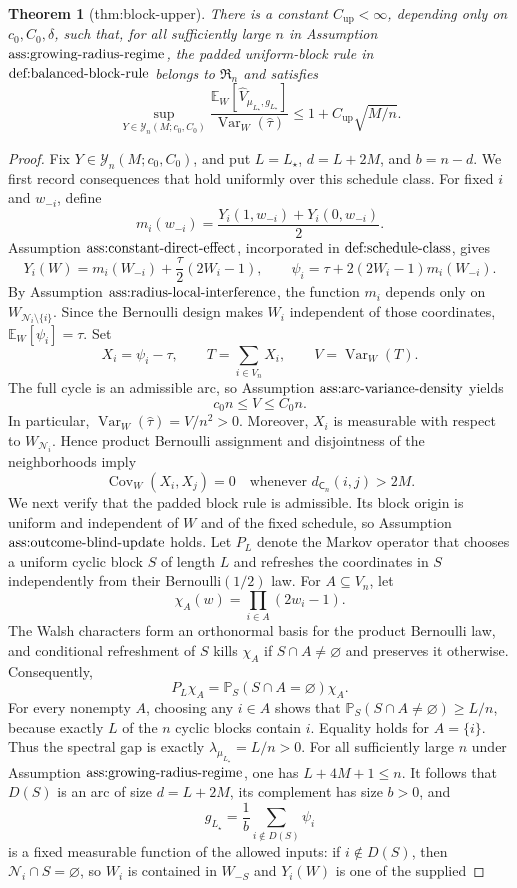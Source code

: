 \documentclass{article}
\newtheorem{theorem}{Theorem}
\begin{document}
\begin{theorem}[thm:block-upper]\label{thm:block-upper}
There is a constant \(C_{\mathrm{up}}<\infty\), depending only on \(c_0,C_0,\delta\), such that, for all sufficiently large \(n\) in Assumption \(\textnormal{ass:growing-radius-regime}\), the padded uniform-block rule in \(\textnormal{def:balanced-block-rule}\) belongs to \(\mathfrak R_n\) and satisfies \[\sup_{Y\in\mathcal Y_n(M;c_0,C_0)}\frac{\mathbb E_W[\widehat V_{\mu_{L_\star},g_{L_\star}}]}{\operatorname{Var}_W(\widehat\tau)}\le 1+C_{\mathrm{up}}\sqrt{M/n}.\]
\end{theorem}
\begin{proof}
Fix \(Y\in\mathcal Y_n(M;c_0,C_0)\), and put \(L=L_\star\), \(d=L+2M\), and \(b=n-d\). We first record consequences that hold uniformly over this schedule class. For fixed \(i\) and \(w_{-i}\), define \[m_i(w_{-i})=\frac{Y_i(1,w_{-i})+Y_i(0,w_{-i})}{2}.\] Assumption \(\textnormal{ass:constant-direct-effect}\), incorporated in \(\textnormal{def:schedule-class}\), gives \[Y_i(W)=m_i(W_{-i})+\frac{\tau}{2}(2W_i-1),\qquad \psi_i=\tau+2(2W_i-1)m_i(W_{-i}).\] By Assumption \(\textnormal{ass:radius-local-interference}\), the function \(m_i\) depends only on \(W_{\mathcal N_i\setminus\{i\}}\). Since the Bernoulli design makes \(W_i\) independent of those coordinates, \(\mathbb E_W[\psi_i]=\tau\). Set \[X_i=\psi_i-\tau,\qquad T=\sum_{i\in V_n}X_i,\qquad V=\operatorname{Var}_W(T).\] The full cycle is an admissible arc, so Assumption \(\textnormal{ass:arc-variance-density}\) yields \[c_0n\le V\le C_0n.\tag{1}\] In particular, \(\operatorname{Var}_W(\widehat\tau)=V/n^2>0\). Moreover, \(X_i\) is measurable with respect to \(W_{\mathcal N_i}\). Hence product Bernoulli assignment and disjointness of the neighborhoods imply \[\operatorname{Cov}_W(X_i,X_j)=0\quad\text{whenever }d_{\mathsf C_n}(i,j)>2M.\tag{2}\] We next verify that the padded block rule is admissible. Its block origin is uniform and independent of \(W\) and of the fixed schedule, so Assumption \(\textnormal{ass:outcome-blind-update}\) holds. Let \(P_L\) denote the Markov operator that chooses a uniform cyclic block \(S\) of length \(L\) and refreshes the coordinates in \(S\) independently from their Bernoulli\((1/2)\) law. For \(A\subseteq V_n\), let \[\chi_A(w)=\prod_{i\in A}(2w_i-1).\] The Walsh characters form an orthonormal basis for the product Bernoulli law, and conditional refreshment of \(S\) kills \(\chi_A\) if \(S\cap A\ne\varnothing\) and preserves it otherwise. Consequently, \[P_L\chi_A=\mathbb P_S(S\cap A=\varnothing)\chi_A.\] For every nonempty \(A\), choosing any \(i\in A\) shows that \(\mathbb P_S(S\cap A\ne\varnothing)\ge L/n\), because exactly \(L\) of the \(n\) cyclic blocks contain \(i\). Equality holds for \(A=\{i\}\). Thus the spectral gap is exactly \(\lambda_{\mu_{L_\star}}=L/n>0\). For all sufficiently large \(n\) under Assumption \(\textnormal{ass:growing-radius-regime}\), one has \(L+4M+1\le n\). It follows that \(D(S)\) is an arc of size \(d=L+2M\), its complement has size \(b>0\), and \[g_{L_\star}=\frac1b\sum_{i\notin D(S)}\psi_i\] is a fixed measurable function of the allowed inputs: if \(i\notin D(S)\), then \(\mathcal N_i\cap S=\varnothing\), so \(W_i\) is contained in \(W_{-S}\) and \(Y_i(W)\) is one of the supplied 
\end{proof}
\end{document}
